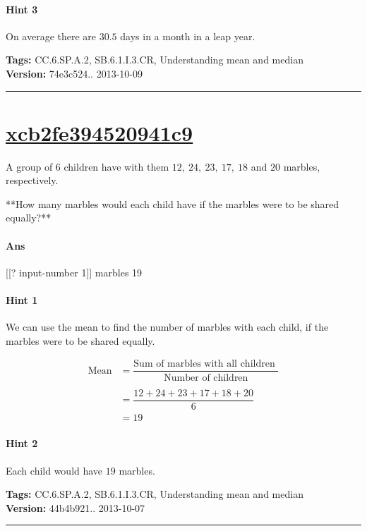 \documentclass[twocolumn,10pt]{article}
\begin{document}
\paragraph{Hint 3}On average there are $30.5$ days in a month in a leap year.



\medskip
\noindent
\textbf{Tags:} {\footnotesize CC.6.SP.A.2, SB.6.1.I.3.CR, Understanding mean and median}\\
\textbf{Version:} 74e3c524.. 2013-10-09
\smallskip\hrule





\section{\href{https://www.khanacademy.org/devadmin/content/items/xcb2fe394520941c9}{xcb2fe394520941c9}}

\noindent
A group of $6$ children have with them $12, ~24, ~23, ~17, ~18$ and $20$ marbles, respectively.  

**How many marbles would each child have if the marbles were to be shared equally?**


\paragraph{Ans} [[? input-number 1]] marbles  19

\paragraph{Hint 1}We can use the mean to find the number of marbles with each child, if the marbles were to be shared equally.

\begin{align*}\text{Mean} &= \dfrac{\text{Sum of marbles with all children }}{\text{Number of children}}\\
\\
 &= \dfrac{12 +24+23+17+18+20 }{6}\\
&=19\end{align*}

\paragraph{Hint 2}Each child would have $19$ marbles.



\medskip
\noindent
\textbf{Tags:} {\footnotesize CC.6.SP.A.2, SB.6.1.I.3.CR, Understanding mean and median}\\
\textbf{Version:} 44b4b921.. 2013-10-07
\smallskip\hrule
\end{document}
